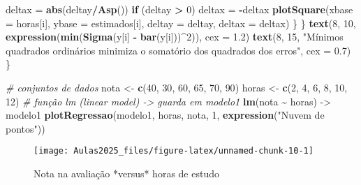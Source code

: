 \documentclass[
]{book}
\newenvironment{Shaded}{\begin{snugshade}}{\end{snugshade}}
\newcommand{\AttributeTok}[1]{\textcolor[rgb]{0.13,0.29,0.53}{#1}}
\newcommand{\CommentTok}[1]{\textcolor[rgb]{0.56,0.35,0.01}{\textit{#1}}}
\newcommand{\ControlFlowTok}[1]{\textcolor[rgb]{0.13,0.29,0.53}{\textbf{#1}}}
\newcommand{\DecValTok}[1]{\textcolor[rgb]{0.00,0.00,0.81}{#1}}
\newcommand{\FloatTok}[1]{\textcolor[rgb]{0.00,0.00,0.81}{#1}}
\newcommand{\FunctionTok}[1]{\textcolor[rgb]{0.13,0.29,0.53}{\textbf{#1}}}
\newcommand{\NormalTok}[1]{#1}
\newcommand{\OtherTok}[1]{\textcolor[rgb]{0.56,0.35,0.01}{#1}}
\newcommand{\SpecialCharTok}[1]{\textcolor[rgb]{0.81,0.36,0.00}{\textbf{#1}}}
\newcommand{\StringTok}[1]{\textcolor[rgb]{0.31,0.60,0.02}{#1}}
\begin{document}
\begin{Shaded}
\begin{Highlighting}[]
\NormalTok{            deltax }\OtherTok{=} \FunctionTok{abs}\NormalTok{(deltay}\SpecialCharTok{/}\FunctionTok{Asp}\NormalTok{())}
            \ControlFlowTok{if}\NormalTok{ (deltay }\SpecialCharTok{\textgreater{}} \DecValTok{0}\NormalTok{)}
\NormalTok{                deltax }\OtherTok{=} \SpecialCharTok{{-}}\NormalTok{deltax}
            \FunctionTok{plotSquare}\NormalTok{(}\AttributeTok{xbase =}\NormalTok{ horas[i], }\AttributeTok{ybase =}\NormalTok{ estimados[i],}
                \AttributeTok{deltay =}\NormalTok{ deltay, }\AttributeTok{deltax =}\NormalTok{ deltax)}
\NormalTok{        \}}
\NormalTok{    \}}
    \FunctionTok{text}\NormalTok{(}\DecValTok{8}\NormalTok{, }\DecValTok{10}\NormalTok{, }\FunctionTok{expression}\NormalTok{(}\FunctionTok{min}\NormalTok{(}\FunctionTok{Sigma}\NormalTok{(y[i] }\SpecialCharTok{{-}} \FunctionTok{bar}\NormalTok{(y[i]))}\SpecialCharTok{\^{}}\DecValTok{2}\NormalTok{)), }\AttributeTok{cex =} \FloatTok{1.2}\NormalTok{)}
    \FunctionTok{text}\NormalTok{(}\DecValTok{8}\NormalTok{, }\DecValTok{15}\NormalTok{, }\StringTok{"Mínimos quadrados ordinários minimiza o somatório dos quadrados dos erros"}\NormalTok{,}
        \AttributeTok{cex =} \FloatTok{0.7}\NormalTok{)}
\NormalTok{\}}
\end{Highlighting}
\end{Shaded}

\begin{Shaded}
\begin{Highlighting}[]
\CommentTok{\# conjuntos de dados}
\NormalTok{nota }\OtherTok{\textless{}{-}} \FunctionTok{c}\NormalTok{(}\DecValTok{40}\NormalTok{, }\DecValTok{30}\NormalTok{, }\DecValTok{60}\NormalTok{, }\DecValTok{65}\NormalTok{, }\DecValTok{70}\NormalTok{, }\DecValTok{90}\NormalTok{)}
\NormalTok{horas }\OtherTok{\textless{}{-}} \FunctionTok{c}\NormalTok{(}\DecValTok{2}\NormalTok{, }\DecValTok{4}\NormalTok{, }\DecValTok{6}\NormalTok{, }\DecValTok{8}\NormalTok{, }\DecValTok{10}\NormalTok{, }\DecValTok{12}\NormalTok{)}
\CommentTok{\# função lm (linear model) {-}\textgreater{} guarda em modelo1}
\FunctionTok{lm}\NormalTok{(nota }\SpecialCharTok{\textasciitilde{}}\NormalTok{ horas) }\OtherTok{{-}\textgreater{}}\NormalTok{ modelo1}
\FunctionTok{plotRegressao}\NormalTok{(modelo1, horas, nota, }\DecValTok{1}\NormalTok{, }\FunctionTok{expression}\NormalTok{(}\StringTok{"Nuvem de pontos"}\NormalTok{))}
\end{Highlighting}
\end{Shaded}

\begin{figure}

{\centering \texttt{[image: Aulas2025\_files/figure-latex/unnamed-chunk-10-1]} 

}

\caption{Nota na avaliação *versus* horas de estudo}\label{fig:unnamed-chunk-10-1}
\end{figure}
\end{document}
